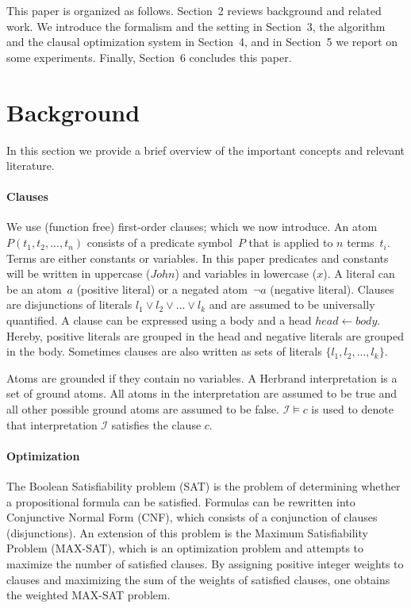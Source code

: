 \documentclass[letterpaper]{article}
\newcommand{\sym}[1]{\ensuremath{\mathcal{#1}}}
\theoremstyle{definition}
\begin{document}
This paper is organized as follows.
Section~2 reviews background and related work.
We introduce the formalism and the setting in Section~3, the algorithm and the clausal optimization system in Section~4, and in Section~5 we report on some experiments.
Finally, Section~6 concludes this paper.


\section{Background}
In this section we provide a brief overview of the important concepts and relevant literature.

\paragraph{Clauses}
We use (function free) first-order clauses; which we now introduce.
An atom $P(t_1, t_2, ..., t_n)$ consists of a predicate symbol~$P$ that is applied to $n$ terms~$t_i$.
Terms are either constants or variables.
In this paper predicates and constants will be written in uppercase ($\mathit{John}$) and variables in lowercase ($\mathit{x}$).
A literal can be an atom~$a$ (positive literal) or a negated atom~$\lnot a$ (negative literal).
Clauses are disjunctions of literals $l_1 \lor l_2 \lor ... \lor l_k$ and are assumed to be universally quantified.
A clause can be expressed using a body and a head $\mathit{head} \leftarrow \mathit{body}$.
Hereby, positive literals are grouped in the head and negative literals are grouped in the body.
Sometimes clauses are also written as sets of literals $\{l_1, l_2, ..., l_k\}$.

Atoms are grounded if they contain no variables.
A Herbrand interpretation is a set of ground atoms.
All atoms in the interpretation are assumed to be true and all other possible ground atoms are assumed to be false.
$\sym{I} \models c$ is used to denote that interpretation \sym{I} satisfies the clause $c$.

\paragraph{Optimization}
The Boolean Satisfiability problem (SAT) is the problem of determining whether a propositional formula can be satisfied.
Formulas can be rewritten into Conjunctive Normal Form (CNF), which consists of a conjunction of clauses (disjunctions).
An extension of this problem is the Maximum Satisfiability Problem (MAX-SAT), which is an optimization problem and attempts to maximize the number of satisfied clauses.
By assigning positive integer weights to clauses and maximizing the sum of the weights of satisfied clauses, one obtains the weighted MAX-SAT problem.
\end{document}
